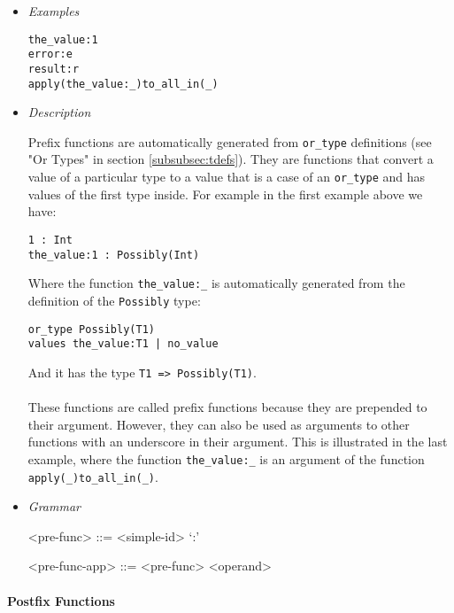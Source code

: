 \documentclass{article}
\begin{document}
\begin{itemize}

\item \textit{Examples}
\begin{verbatim}
the_value:1
error:e
result:r
apply(the_value:_)to_all_in(_)
\end{verbatim}

\item \textit{Description}

Prefix functions are automatically generated from \verb|or_type| definitions
(see "Or Types" in section \ref{subsubsec:tdefs}). They are functions that
convert a value of a particular type to a value that is a case of an
\verb|or_type| and has values of the first type inside. For example in the
first example above we have:
\begin{verbatim}
1 : Int
the_value:1 : Possibly(Int)
\end{verbatim}
Where the function \verb|the_value:_| is automatically generated from the
definition of the \verb|Possibly| type:
\begin{verbatim}
or_type Possibly(T1)
values the_value:T1 | no_value
\end{verbatim}
And it has the type \verb|T1 => Possibly(T1)|.
\\\\
These functions are called prefix functions because they are prepended to their
argument. However, they can also be used as arguments to other functions with
an underscore in their argument.  This is illustrated in the last example,
where the function \verb|the_value:_| is an argument of the function
\verb|apply(_)to_all_in(_)|.

\item \textit{Grammar}
\begin{grammar}
<pre-func> ::= <simple-id> `:'

<pre-func-app> ::= <pre-func> <operand>
\end{grammar}

\end{itemize}

\newpage
\paragraph{Postfix Functions}
\end{document}
